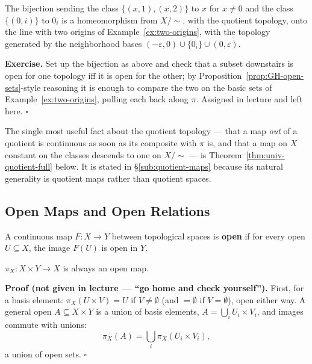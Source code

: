 \documentclass[11pt]{report}
\makeatletter
\newcounter{defcounter}[section]
\newcounter{thmcounter}[section]
\newcounter{excounter}[section]
\renewenvironment{proof}[1][Proof]{\noindent\textbf{#1.} }{\hfill$\square$\par\vspace{5pt}}
\newcommand{\thmlabel}[1]{\edef\@currentlabel{\arabic{section}.\arabic{thmcounter}}\label{#1}}
\newcommand{\deflabel}[1]{\edef\@currentlabel{\arabic{section}.\arabic{defcounter}}\label{#1}}
\newcommand{\exlabel}[1]{\edef\@currentlabel{\arabic{section}.\arabic{excounter}}\label{#1}}
\makeatother
\begin{document}
\begin{propbox}\thmlabel{prop:two-origins-agree}
The bijection sending the class $\{(x,1),(x,2)\}$ to $x$ for $x \neq 0$ and the class $\{(0,i)\}$ to $0_i$ is a homeomorphism from $X/{\sim}$, with the quotient topology, onto the line with two origins of Example~\ref{ex:two-origins}, with the topology generated by the neighborhood bases $(-\varepsilon,0) \cup \{0_i\} \cup (0,\varepsilon)$.
\end{propbox}

\begin{proof}[Exercise]
Set up the bijection as above and check that a subset downstairs is open for one topology iff it is open for the other; by Proposition~\ref{prop:GH-open-sets}-style reasoning it is enough to compare the two on the basic sets of Example~\ref{ex:two-origins}, pulling each back along $\pi$. Assigned in lecture and left here.
\end{proof}

The single most useful fact about the quotient topology --- that a map \emph{out} of a quotient is continuous as soon as its composite with $\pi$ is, and that a map on $X$ constant on the classes descends to one on $X/{\sim}$ --- is Theorem~\ref{thm:univ-quotient-full} below. It is stated in \S\ref{sub:quotient-maps} because its natural generality is quotient maps rather than quotient spaces.

\subsection{Open Maps and Open Relations}\label{sub:open-relations}

\begin{defbox}\deflabel{def:open-map}
A continuous map $F : X \to Y$ between topological spaces is \textbf{open} if for every open $U \subseteq X$, the image $F(U)$ is open in $Y$.
\end{defbox}

\begin{exbox}\exlabel{ex:proj-open}
$\pi_X : X \times Y \to X$ is always an open map.
\end{exbox}

\begin{proof}[Proof (not given in lecture --- ``go home and check yourself'')]
First, for a basis element: $\pi_X(U \times V) = U$ if $V \neq \emptyset$ (and $= \emptyset$ if $V = \emptyset$), open either way. A general open $A \subseteq X \times Y$ is a union of basis elements, $A = \bigcup_i U_i \times V_i$, and images commute with unions:
\[
\pi_X(A) = \bigcup_i \pi_X(U_i \times V_i),
\]
a union of open sets.
\end{proof}
\end{document}
